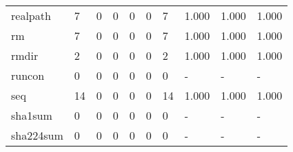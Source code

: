 \begin{longtable}{lp{2.0cm}p{2.0cm}p{2.0cm}p{2.0cm}p{2.0cm}p{2.0cm}p{2.0cm}p{2.0cm}p{2.0cm}}
realpath  &                      7 &                                  0 &                                 0 &                                0 &                                 0 &                               7 &                                1.000 &                                  1.000 &                                1.000 \\
rm        &                      7 &                                  0 &                                 0 &                                0 &                                 0 &                               7 &                                1.000 &                                  1.000 &                                1.000 \\
rmdir     &                      2 &                                  0 &                                 0 &                                0 &                                 0 &                               2 &                                1.000 &                                  1.000 &                                1.000 \\
runcon    &                      0 &                                  0 &                                 0 &                                0 &                                 0 &                               0 &                                    - &                                      - &                                    - \\
seq       &                     14 &                                  0 &                                 0 &                                0 &                                 0 &                              14 &                                1.000 &                                  1.000 &                                1.000 \\
sha1sum   &                      0 &                                  0 &                                 0 &                                0 &                                 0 &                               0 &                                    - &                                      - &                                    - \\
sha224sum &                      0 &                                  0 &                                 0 &                                0 &                                 0 &                               0 &                                    - &                                      - &                                    - \\

\end{longtable}
